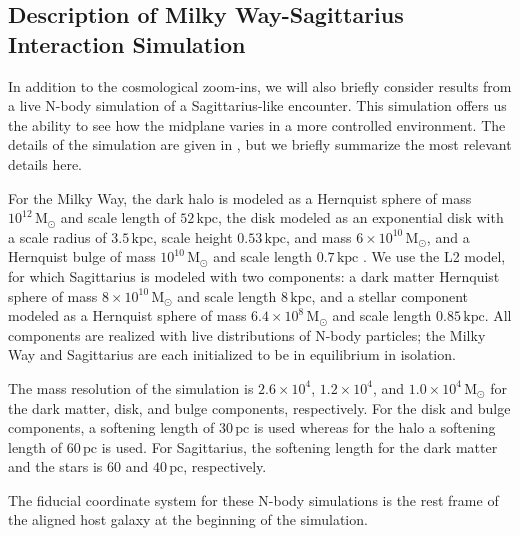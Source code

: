 \documentclass[twocolumn]{aastex62}
\newcommand{\Msun}{\ensuremath{\text{M}_\odot}}
\newcommand{\pc}{\text{pc}}
\newcommand{\kpc}{\text{kpc}}
\begin{document}
\subsection{Description of Milky Way-Sagittarius Interaction Simulation}
\label{ssec:sag_sim}
In addition to the cosmological zoom-ins, we will also briefly consider
results from a live N-body simulation of a Sagittarius-like encounter. This
simulation offers us the ability to see how the midplane varies in a more
controlled environment. The details of the simulation are given in
\citet{2018MNRAS.481..286L}, but we briefly summarize the most relevant
details here.

For the Milky Way, the dark halo is modeled as a Hernquist
sphere of mass $10^{12}\,\Msun$ and scale length of $52\,\kpc$, the disk
modeled as an exponential disk with a scale radius of $3.5\,\kpc$, scale
height $0.53\,\kpc$, and mass $6\times10^{10}\,\Msun$, and a Hernquist bulge
of mass $10^{10}\,\Msun$ and scale length $0.7\,\kpc$
\citep{1990ApJ...356..359H}. We use the L2 model, for which Sagittarius is
modeled with two components: a dark matter Hernquist sphere of mass $8\times10^{10}\,\Msun$ and
scale length $8\,\kpc$, and a stellar component modeled as a Hernquist
sphere of mass $6.4\times10^8\,\Msun$ and scale length $0.85\,\kpc$. All
components are realized with live distributions of N-body particles; the Milky
Way and Sagittarius are each initialized to be in equilibrium in isolation.

The mass resolution of the simulation is $2.6\times10^4$, $1.2\times10^4$, and
$1.0\times10^4\,\Msun$ for the dark matter, disk, and bulge components,
respectively. For the disk and bulge components, a softening length of
$30\,\pc$ is used whereas for the halo a softening length of $60\,\pc$ is
used. For Sagittarius, the softening length for the dark matter and the stars
is $60$ and $40\,\pc$, respectively.

The fiducial coordinate system for these N-body simulations is the rest frame
of the aligned host galaxy at the beginning of the simulation.
\end{document}
